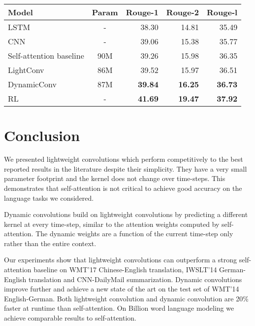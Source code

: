 \documentclass{article} \usepackage{iclr2019_conference,times}
\def\sdconvfull{lightweight convolution}
\def\sdconv{LightConv}
\def\Tvsdconvfull{Dynamic convolution}
\def\tvsdconvfull{dynamic convolution}
\def\tvsdconv{DynamicConv}
\def\gbw{Billion word}
\def\cnndm{CNN-DailyMail}
\def\iwslt{IWSLT}
\begin{document}
\begin{table*}[t]
\centering
\begin{tabular}{lcrrr}
\toprule
Model & Param & Rouge-1 & Rouge-2 & Rouge-l \\    
\midrule
LSTM \citep{paulus17intra} & - & 38.30 & 14.81 &  35.49  \\ 
CNN \citep{fan17} & - & 39.06 & 15.38 & 35.77 \\
\midrule
Self-attention baseline & 90M & 39.26 & 15.98 & 36.35  \\
\sdconv & 86M & 39.52 & 15.97 & 36.51  \\
\tvsdconv & 87M & \textbf{39.84} & \textbf{16.25} & \textbf{36.73} \\
\midrule 
RL \citep{celikyilmaz2018deep} & - & \textbf{41.69} & \textbf{19.47} & \textbf{37.92} \\ 
\bottomrule
\end{tabular}
\caption{Results on \cnndm{} summarization. We compare to likelihood trained approaches except for \citet{celikyilmaz2018deep}.}
\label{tab:abs}
\end{table*} 

\section{Conclusion}\label{sec:conclusion}

We presented \sdconvfull{}s which perform competitively to the best reported results in the literature despite their simplicity. 
They have a very small parameter footprint and the kernel does not change over time-steps. 
This demonstrates that self-attention is not critical to achieve good accuracy on the language tasks we considered.

\Tvsdconvfull{}s build on \sdconvfull{}s by predicting a different kernel at every time-step, similar to the attention weights computed by self-attention. 
The dynamic weights are a function of the current time-step only rather than the entire context.

Our experiments show that \sdconvfull{}s can outperform a strong self-attention baseline on WMT'17 Chinese-English translation, \iwslt{}'14 German-English translation and \cnndm{} summarization. 
\Tvsdconvfull{}s improve further and achieve a new state of the art on the test set of WMT'14 English-German.
Both \sdconvfull{} and \tvsdconvfull{} are 20\% faster at runtime than self-attention.
On \gbw{} language modeling we achieve comparable results to self-attention.
\end{document}
